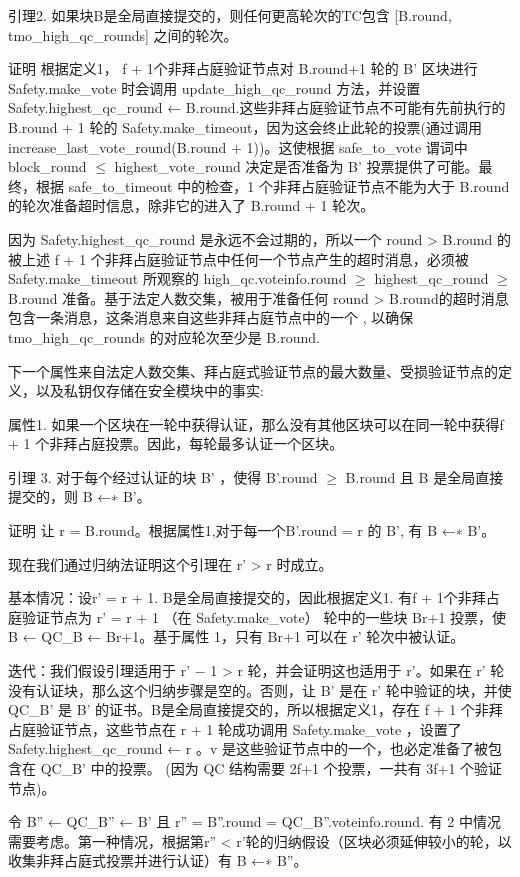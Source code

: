 引理2. 如果块B是全局直接提交的，则任何更高轮次的TC包含 [B.round, tmo\_high\_qc\_rounds] 之间的轮次。

证明 根据定义1， f + 1个非拜占庭验证节点对 B.round+1 轮的 B' 区块进行 Safety.make\_vote 时会调用 update\_high\_qc\_round 方法，并设置 Safety.highest\_qc\_round ← B.round.这些非拜占庭验证节点不可能有先前执行的 B.round + 1 轮的 Safety.make\_timeout，因为这会终止此轮的投票(通过调用 increase\_last\_vote\_round(B.round + 1))。这使根据 safe\_to\_vote 谓词中 block\_round $\leq$ highest\_vote\_round 决定是否准备为 B' 投票提供了可能。最终，根据 safe\_to\_timeout 中的检查，1 个非拜占庭验证节点不能为大于 B.round 的轮次准备超时信息，除非它的进入了 B.round + 1 轮次。

因为 Safety.highest\_qc\_round 是永远不会过期的，所以一个 round > B.round 的被上述 f + 1 个非拜占庭验证节点中任何一个节点产生的超时消息，必须被 Safety.make\_timeout 所观察的 high\_qc.voteinfo.round $\geq$ highest\_qc\_round $\geq$ B.round 准备。基于法定人数交集，被用于准备任何 round > B.round的超时消息包含一条消息，这条消息来自这些非拜占庭节点中的一个 , 以确保 tmo\_high\_qc\_rounds 的对应轮次至少是 B.round.

下一个属性来自法定人数交集、拜占庭式验证节点的最大数量、受损验证节点的定义，以及私钥仅存储在安全模块中的事实:

属性1.  如果一个区块在一轮中获得认证，那么没有其他区块可以在同一轮中获得f + 1  个非拜占庭投票。因此，每轮最多认证一个区块。

引理 3. 对于每个经过认证的块 B' ，使得 B'.round $\geq$ B.round 且 B 是全局直接提交的，则 B ←∗ B'。

证明 让 r = B.round。根据属性1,对于每一个B'.round = r 的 B', 有 B ←∗ B'。

现在我们通过归纳法证明这个引理在 r' > r 时成立。

基本情况：设r' = r + 1.  B是全局直接提交的，因此根据定义1. 有f + 1个非拜占庭验证节点为 r' = r + 1 （在 Safety.make\_vote） 轮中的一些块 Br+1 投票，使 B ← QC\_B ← Br+1。基于属性 1，只有 Br+1 可以在 r' 轮次中被认证。

迭代：我们假设引理适用于 r' − 1 > r 轮，并会证明这也适用于 r'。如果在 r' 轮没有认证块，那么这个归纳步骤是空的。否则，让 B' 是在 r' 轮中验证的块，并使 QC\_B' 是 B' 的证书。B是全局直接提交的，所以根据定义1，存在 f + 1 个非拜占庭验证节点，这些节点在 r + 1 轮成功调用 Safety.make\_vote ，设置了 Safety.highest\_qc\_round ← r 。v 是这些验证节点中的一个，也必定准备了被包含在 QC\_B' 中的投票。 (因为 QC 结构需要 2f+1 个投票，一共有 3f+1 个验证节点)。

令 B'' ← QC\_B'' ← B' 且 r'' = B''.round = QC\_B''.voteinfo.round. 有 2 中情况需要考虑。第一种情况，根据第r'' < r'轮的归纳假设（区块必须延伸较小的轮，以收集非拜占庭式投票并进行认证）有  B ←∗ B''。

